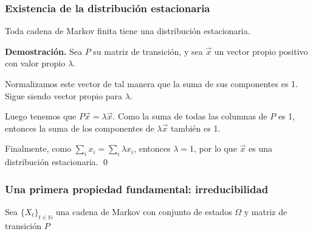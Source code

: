 \begin{frame}
	\frametitle{Existencia de la distribución estacionaria}
	
	{\small
		
		\begin{proposition}
			Toda cadena de Markov finita tiene una distribución estacionaria.
		\end{proposition}
	
	
		{\bf Demostración.} Sea $P$ su matriz de transición, y sea $\vec x$ un vector propio positivo con valor propio $\lambda$.
		
		
		Normalizamos este vector de tal manera que la suma de sus componentes es 1. Sigue siendo vector propio para $\lambda$.
		
		
		Luego tenemos que $P \vec x = \lambda \vec x$. Como la suma de todas las columnas de $P$ es 1, entonces la suma de los componentes de $\lambda \vec x$ también es 1. 
		
		
		Finalmente, como $\sum_{i} x_i = \sum_{i} \lambda x_i$, entonces $\lambda = 1$, por lo que $\vec x$ es una distribución estacionaria. \qed
		
		
	}
	
\end{frame}


\begin{frame}
\frametitle{Una primera propiedad fundamental: irreducibilidad}

{\small

Sea $\{ X_t \}_{t \in \mathbb{N}}$ una cadena de Markov con conjunto de estados $\Omega$ y matriz de transición $P$





}



\end{frame}



